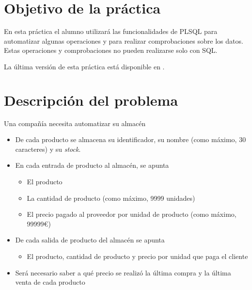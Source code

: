 
\usepackage{needspace}




\renewcommand{\hmwkTitle}{Práctica PLSQL}
\renewcommand{\hmwkClass}{Gestión de Bases de datos}







\primerapagina


\section{Objetivo de la práctica}
En esta práctica el alumno utilizará las funcionalidades de PLSQL para automatizar algunas operaciones y para realizar comprobaciones sobre los datos. Estas operaciones y comprobaciones no pueden realizarse solo con SQL.

La última versión de esta práctica está disponible en .


\section{Descripción del problema}
Una compañía necesita automatizar su almacén
\begin{itemize}
\item De cada producto se almacena su identificador, su nombre (como máximo, 30 caracteres) y su \textit{stock}.
\item En cada entrada de producto al almacén, se apunta
  \begin{itemize}
  \item El producto
  \item La cantidad de producto (como máximo, 9999 unidades)
  \item El precio pagado al proveedor por unidad de producto (como máximo, 99999{\euro})
  \end{itemize}
\item De cada salida de producto del almacén se apunta
  \begin{itemize}
  \item El producto, cantidad de producto y precio por unidad que paga el cliente
  \end{itemize}
\item Será necesario saber a qué precio se realizó la última compra y la última venta de cada producto  \end{itemize}




